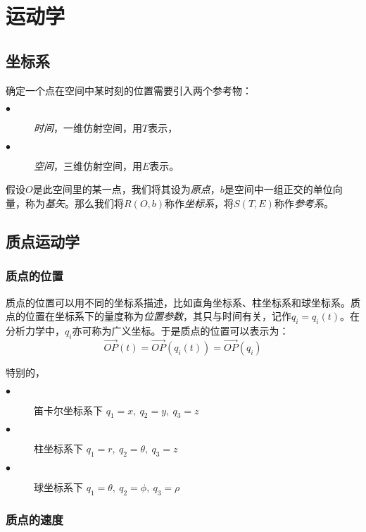 \documentclass[UTF8]{ctexart}%
\begin{document}
\section{运动学}
\label{sec:运动学}

\subsection{坐标系}
\label{sec:坐标系}
确定一个点在空间中某时刻的位置需要引入两个参考物：
\begin{description}
	\item[$\bullet$] \emph{时间}，一维仿射空间，用$T$表示，
	\item[$\bullet$] \emph{空间}，三维仿射空间，用$E$表示。
\end{description}

假设$O$是此空间里的某一点，我们将其设为\emph{原点}，$b$是空间中一组正交的单位向量，称为\emph{基矢}。那么我们将$R\left(O,b\right)$称作\emph{坐标系}，将$S\left(T,E\right)$称作\emph{参考系}。
\subsection{质点运动学}
\label{sec:质点运动学}

\subsubsection{质点的位置}
\label{sec:质点的位置}
质点的位置可以用不同的坐标系描述，比如直角坐标系、柱坐标系和球坐标系。质点的位置在坐标系下的量度称为\emph{位置参数}，其只与时间有关，记作$q_i=q_i\left(t\right)$。在分析力学中，$q_i$亦可称为广义坐标。于是质点的位置可以表示为：
\begin{equation}
\overrightarrow{OP}\left(t\right)=\overrightarrow{OP}\left(q_i\left(t\right)\right)=\overrightarrow{OP}\left(q_i\right)
\end{equation}

特别的，
\begin{description}
	\item[$\bullet$] 笛卡尔坐标系下 $q_1=x,\ q_2=y,\ q_3=z$
	\item[$\bullet$] 柱坐标系下 $q_1=r,\ q_2=\theta,\ q_3=z$
	\item[$\bullet$] 球坐标系下 $q_1=\theta,\ q_2=\phi,\ q_3=\rho$
\end{description}

\subsubsection{质点的速度}
\label{sec:质点的速度}
\end{document}
